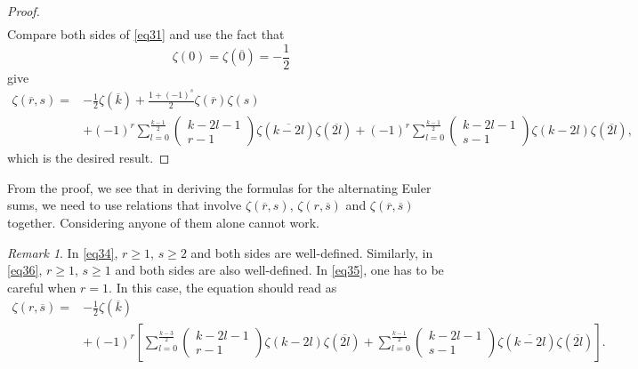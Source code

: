 \documentclass[reqno]{amsart}
\theoremstyle{definition}
\theoremstyle{remark}
\newtheorem{remark}[theorem]{Remark}
\numberwithin{equation}{section}
\begin{document}
\begin{proof}
\begin{align*}
\end{align*}
Compare both sides of \eqref{eq31} and use the fact that
$$\zeta(0)=\zeta(\overline{0})=-\frac{1}{2}$$ give
\begin{align*}
\zeta(\overline{r}, s)
=&-\frac{1}{2}\zeta(\overline{k})
+\frac{1+(-1)^s}{2}\zeta(\overline{r})\zeta(s)
\\&+(-1)^r\sum_{l=0}^{\frac{k-1}{2}}\begin{pmatrix}k-2l-1\\r-1\end{pmatrix}\zeta(\overline{k-2l})\zeta(\overline{2l})
+(-1)^r\sum_{l=0}^{\frac{k-1}{2}} \begin{pmatrix}k-2l-1\\s-1\end{pmatrix}\zeta(k-2l)\zeta(\overline{2l}),
\end{align*}which is the desired result.
\end{proof}

From the proof, we see that in deriving the formulas for the alternating Euler sums, we need to use relations that involve $\zeta(\overline{r}, s)$, $\zeta(r, \overline{s})$ and $\zeta(\overline{r}, \overline{s})$ together. Considering anyone of them alone cannot work.

\begin{remark}
In \eqref{eq34}, $r\geq 1$, $s\geq 2$ and both sides are well-defined. Similarly, in \eqref{eq36}, $r\geq 1$, $s\geq 1$ and both sides are also well-defined. In \eqref{eq35}, one has to be careful when $r=1$. In this case, the equation should read as
\begin{equation}\label{eq57}\begin{split}
\zeta(r, \overline{s})=&-\frac{1}{2} \zeta(\overline{k})
\\&+(-1)^r\left[\sum_{l=0}^{\frac{k-3}{2}} \begin{pmatrix}k-2l-1\\r-1\end{pmatrix}\zeta(k-2l)\zeta(\overline{2l}) + \sum_{l=0}^{\frac{k-1}{2}} \begin{pmatrix}k-2l-1\\s-1\end{pmatrix}\zeta(\overline{k-2l})\zeta(\overline{2l})\right].
\end{split}\end{equation}

\end{remark}
\end{document}
